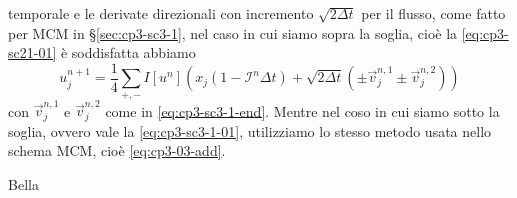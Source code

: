 temporale e le derivate direzionali con incremento $\sqrt{2\Delta t}$
per il flusso, come fatto per MCM in §\ref{sec:cp3-sc3-1}, nel caso in
cui siamo sopra la soglia, cioè la \eqref{eq:cp3-sc21-01} è soddisfatta abbiamo
\begin{equation}
  \label{eq:cp3-sc3-09}
  u_j^{n+1}=\frac{1}{4}\sum_{+,-}I[u^n]\left(x_j(1-\mathcal{I}^n\Delta
  t)+ \sqrt{2\Delta t}(\pm\vec{v}_j^{n,1}\pm\vec{v}_j^{n,2})\right)
\end{equation}
con $\vec{v}_j^{n,1}$ e $\vec{v}_j^{n,2}$ come in
\eqref{eq:cp3-sc3-1-end}. Mentre nel coso in cui siamo sotto la
soglia, ovvero vale la \eqref{eq:cp3-sc3-1-01}, utilizziamo lo stesso
metodo usata nello schema MCM, cioè \eqref{eq:cp3-03-add}.
\begin{osservazione}
  \label{oss:cp3-sc3-02}
 Bella
\end{osservazione}
